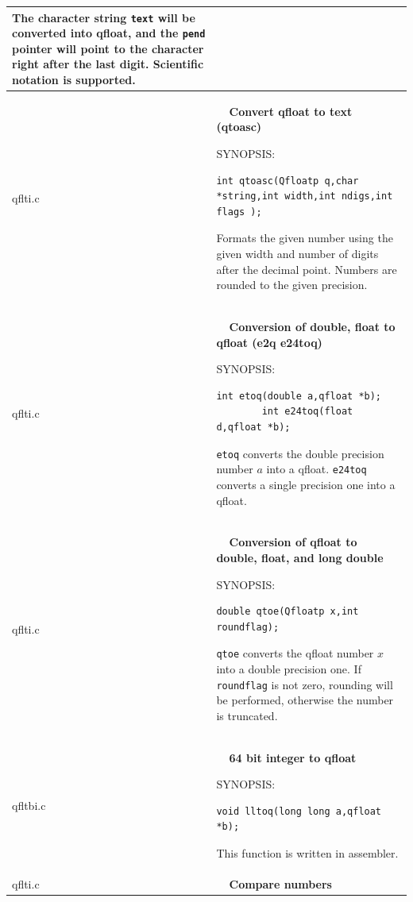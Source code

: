\documentclass[10pt,a4paper,x11names]{memoir} %
\newcounter{entry}
\newcommand{\TOC}[1] {\addcontentsline{toc}{section}{\theentry\ \  #1} \textbf{\theentry\ \  #1} \par\stepcounter{entry}}
\begin{document}
\begin{longtable}{|p{1.5cm}|p{11.5cm}|}
	The character string \verb,text, will be converted into qfloat, and the \verb,pend, pointer will point to the character right after the last digit. Scientific notation is supported.
	\\\hline
	qflti.c& \TOC{Convert qfloat to text (qtoasc)}\index{qtoasc}
	
	{\footnotesize SYNOPSIS:}\vspace{-0.2cm}
	\begin{lstlisting}[numbers=none]
int qtoasc(Qfloatp q,char *string,int width,int ndigs,int flags );
	\end{lstlisting}\vspace{-0.2cm} \par
	
	Formats the given number using the given width and number of digits after the decimal point. Numbers are rounded to the given
	precision.
	\\\hline
	qflti.c&\TOC{Conversion of double, float to qfloat (e2q e24toq)}
	
	{\footnotesize SYNOPSIS:}\vspace{-0.2cm}\index{etoq}\index{e24toq}
	\begin{lstlisting}[numbers=none]
		int etoq(double a,qfloat *b);
		int e24toq(float d,qfloat *b);
	\end{lstlisting}\vspace{-0.2cm} \par
	\verb,etoq, converts the double precision number $a$ into a qfloat. \verb,e24toq, converts a single
	precision one into a qfloat.
	\\\hline
	qflti.c& \TOC{Conversion of qfloat to double, float, and long double}
	
	{\footnotesize SYNOPSIS:}\vspace{-0.2cm}\index{qtoe}
	\begin{lstlisting}[numbers=none]
		double qtoe(Qfloatp x,int roundflag);
	\end{lstlisting}\vspace{-0.2cm} \par
	
	\verb,qtoe, converts the qfloat number $x$ into a double precision one. If \verb,roundflag, is not zero, rounding will be performed,
	otherwise the number is truncated.
	\\\hline
	qfltbi.c&\TOC{64 bit integer to qfloat}
	
	{\footnotesize SYNOPSIS:}\vspace{-0.2cm}\index{lltoq}
	\begin{lstlisting}[numbers=none]
		void lltoq(long long a,qfloat *b);
	\end{lstlisting}\vspace{-0.2cm} \par
	This function is written in assembler.
	\\\hline
	qflti.c& \TOC{Compare numbers}
	

\end{longtable}
\end{document}
